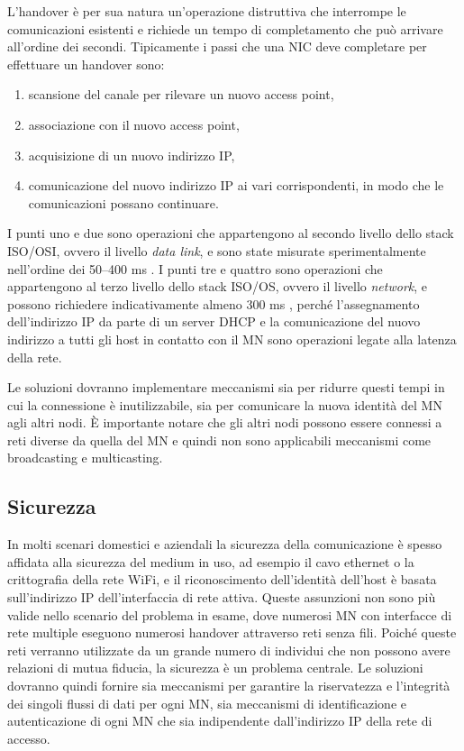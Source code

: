 \documentclass[12pt,a4paper,openright,twoside]{book}
\begin{document}
L'handover è per sua natura un'operazione distruttiva che interrompe
le comunicazioni esistenti e richiede un tempo di completamento che
può arrivare all'ordine dei secondi. Tipicamente i passi che una NIC
deve completare per effettuare un handover sono:
\begin{enumerate}
\item scansione del canale per rilevare un nuovo access point,
\item associazione con il nuovo access point,
\item acquisizione di un nuovo indirizzo IP,
\item comunicazione del nuovo indirizzo IP ai vari corrispondenti, in
  modo che le comunicazioni possano continuare.
\end{enumerate}
I punti uno e due sono operazioni che appartengono al secondo livello
dello stack ISO/OSI, ovvero il livello \emph{data link}, e sono state
misurate sperimentalmente nell'ordine dei 50--400 ms
\cite{bib:misura-handoff-l2}. I punti tre e quattro sono operazioni
che appartengono al terzo livello dello stack ISO/OS, ovvero il
livello \emph{network}, e possono richiedere indicativamente almeno
300 ms \cite{bib:misura-handoff-dhcp}, perché l'assegnamento
dell'indirizzo IP da parte di un server DHCP e la comunicazione del
nuovo indirizzo a tutti gli host in contatto con il MN sono operazioni
legate alla latenza della rete.

Le soluzioni dovranno implementare meccanismi sia per ridurre questi
tempi in cui la connessione è inutilizzabile, sia per comunicare la
nuova identità del MN agli altri nodi. È importante notare che gli
altri nodi possono essere connessi a reti diverse da quella del MN e
quindi non sono applicabili meccanismi come broadcasting e
multicasting.

\subsection{Sicurezza}
In molti scenari domestici e aziendali la sicurezza della
comunicazione è spesso affidata alla sicurezza del medium in uso, ad
esempio il cavo ethernet o la crittografia della rete WiFi, e il
riconoscimento dell'identità dell'host è basata sull'indirizzo IP
dell'interfaccia di rete attiva. Queste assunzioni non sono più valide
nello scenario del problema in esame, dove numerosi MN con interfacce
di rete multiple eseguono numerosi handover attraverso reti senza
fili. Poiché queste reti verranno utilizzate da un grande numero di
individui che non possono avere relazioni di mutua fiducia, la
sicurezza è un problema centrale. Le soluzioni dovranno quindi fornire
sia meccanismi per garantire la riservatezza e l'integrità dei singoli
flussi di dati per ogni MN, sia meccanismi di identificazione e
autenticazione di ogni MN che sia indipendente dall'indirizzo IP della
rete di accesso.
\end{document}
